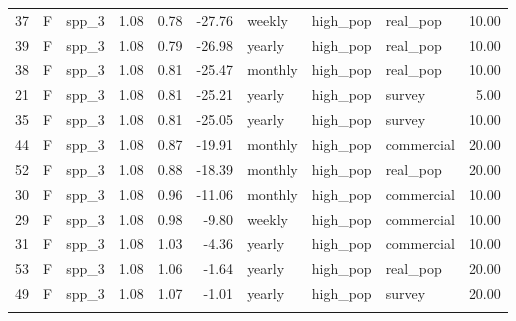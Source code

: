 \begin{longtable}{rllrrrlllr}
   37 & F & spp\_3 & 1.08 & 0.78 & -27.76 & weekly & high\_pop & real\_pop & 10.00 \\ 
   39 & F & spp\_3 & 1.08 & 0.79 & -26.98 & yearly & high\_pop & real\_pop & 10.00 \\ 
   38 & F & spp\_3 & 1.08 & 0.81 & -25.47 & monthly & high\_pop & real\_pop & 10.00 \\ 
   21 & F & spp\_3 & 1.08 & 0.81 & -25.21 & yearly & high\_pop & survey & 5.00 \\ 
   35 & F & spp\_3 & 1.08 & 0.81 & -25.05 & yearly & high\_pop & survey & 10.00 \\ 
   44 & F & spp\_3 & 1.08 & 0.87 & -19.91 & monthly & high\_pop & commercial & 20.00 \\ 
   52 & F & spp\_3 & 1.08 & 0.88 & -18.39 & monthly & high\_pop & real\_pop & 20.00 \\ 
   30 & F & spp\_3 & 1.08 & 0.96 & -11.06 & monthly & high\_pop & commercial & 10.00 \\ 
   29 & F & spp\_3 & 1.08 & 0.98 & -9.80 & weekly & high\_pop & commercial & 10.00 \\ 
   31 & F & spp\_3 & 1.08 & 1.03 & -4.36 & yearly & high\_pop & commercial & 10.00 \\ 
   53 & F & spp\_3 & 1.08 & 1.06 & -1.64 & yearly & high\_pop & real\_pop & 20.00 \\ 
   49 & F & spp\_3 & 1.08 & 1.07 & -1.01 & yearly & high\_pop & survey & 20.00 \\ 
   \hline
\hline
\label{tab:6}
\end{longtable}
